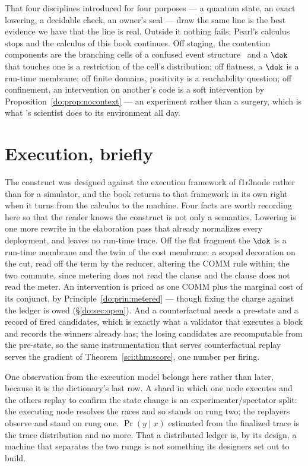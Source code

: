 That four disciplines introduced for four purposes --- a quantum state, an exact lowering, a
decidable check, an owner's seal --- draw the same line is the best evidence we have that the line
is real. Outside it nothing fails; Pearl's calculus stops and the calculus of this book continues.
Off staging, the contention components are the branching cells of a confused event
structure~\cite{AbbesBenveniste} and a $\dok$ that touches one is a restriction of the cell's
distribution; off flatness, a $\dok$ is a run-time membrane; off finite domains, positivity is a
reachability question; off confinement, an intervention on another's code is a soft intervention
by Proposition~\ref{do:prop:nocontext} --- an experiment rather than a surgery, which is what
\chSci's scientist does to its environment all day.

\section{Execution, briefly}
\label{do:sec:execution}

The construct was designed against the execution framework of f1r3node rather than for a
simulator, and the book returns to that framework in its own right when it turns from the calculus
to the machine. Four facts are worth recording here so that the reader knows the construct is not
only a semantics. Lowering is one more rewrite in the elaboration pass that already normalizes
every deployment, and leaves no run-time trace. Off the flat fragment the $\dok$ is a run-time
membrane and the twin of the cost membrane: a scoped decoration on the cut, read off the term by
the reducer, altering the COMM rule within; the two commute, since metering does not read the
clause and the clause does not read the meter. An intervention is priced as one COMM plus the
marginal cost of its conjunct, by Principle~\ref{do:prin:metered} --- though fixing the charge
against the ledger is owed (\S\ref{do:sec:open}). And a counterfactual needs a pre-state and a
record of fired candidates, which is exactly what a validator that executes a block and records
the winners already has; the losing candidates are recomputable from the pre-state, so the same
instrumentation that serves counterfactual replay serves the gradient of
Theorem~\ref{sci:thm:score}, one number per firing.

One observation from the execution model belongs here rather than later, because it is the
dictionary's last row. A shard in which one node executes and the others replay to confirm the
state change is an experimenter/spectator split: the executing node resolves the races and so
stands on rung two; the replayers observe and stand on rung one. $\Pr(y \mid x)$ estimated from
the finalized trace is the trace distribution and no more. That a distributed ledger is, by its
design, a machine that separates the two rungs is not something its designers set out to build.

